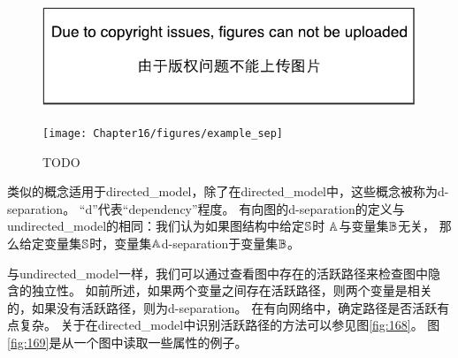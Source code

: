 \begin{figure}[!htb]
\ifOpenSource
\centerline{\includegraphics{figure.pdf}}
\else
	\centerline{\texttt{[image: Chapter16/figures/example\_sep]}}
\fi
	\caption{TODO}
	\label{fig:example_sep}
\end{figure}



类似的概念适用于\gls{directed_model}，除了在\gls{directed_model}中，这些概念被称为d-\gls{separation}。
“d”代表“\gls{dependency}”程度。
有向图的d-\gls{separation}的定义与\gls{undirected_model}的相同：我们认为如果图结构中给定$\mathbb{S}$时 $\mathbb{A}$与变量集$\mathbb{B}$无关，
那么给定变量集$\mathbb{S}$时，变量集$\mathbb{A}$d-\gls{separation}于变量集$\mathbb{B}$。


与\gls{undirected_model}一样，我们可以通过查看图中存在的活跃路径来检查图中隐含的独立性。
如前所述，如果两个变量之间存在活跃路径，则两个变量是相关的，如果没有活跃路径，则为d-\gls{separation}。
在有向网络中，确定路径是否活跃有点复杂。
关于在\gls{directed_model}中识别活跃路径的方法可以参见图\ref{fig:168}。 
图\ref{fig:169}是从一个图中读取一些属性的例子。


